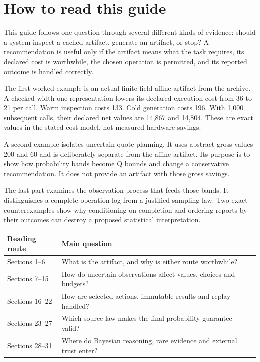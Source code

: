 \documentclass[11pt]{article}
\begin{document}
\KomorebiCover
{}



\section*{How to read this guide}
This guide follows one question through several different kinds of evidence: should a system inspect a cached artifact, generate an artifact, or stop? A recommendation is useful only if the artifact means what the task requires, its declared cost is worthwhile, the chosen operation is permitted, and its reported outcome is handled correctly.

The first worked example is an actual finite-field affine artifact from the archive. A checked width-one representation lowers its declared execution cost from 36 to 21 per call. Warm inspection costs 133. Cold generation costs 196. With 1,000 subsequent calls, their declared net values are 14,867 and 14,804. These are exact values in the stated cost model, not measured hardware savings.

A second example isolates uncertain quote planning. It uses abstract gross values 200 and 60 and is deliberately separate from the affine artifact. Its purpose is to show how probability bands become Q bounds and change a conservative recommendation. It does not provide an artifact with those gross savings.

The last part examines the observation process that feeds those bands. It distinguishes a complete operation log from a justified sampling law. Two exact counterexamples show why conditioning on completion and ordering reports by their outcomes can destroy a proposed statistical interpretation.

\begin{center}
\begin{tabular}{p{}p{}}
\toprule
Reading route & Main question\\
\midrule
Sections 1--6 & What is the artifact, and why is either route worthwhile?\\
Sections 7--15 & How do uncertain observations affect values, choices and budgets?\\
Sections 16--22 & How are selected actions, immutable results and replay handled?\\
Sections 23--27 & Which source law makes the final probability guarantee valid?\\
Sections 28--31 & Where do Bayesian reasoning, rare evidence and external trust enter?\\
\bottomrule
\end{tabular}
\end{center}
\end{document}
